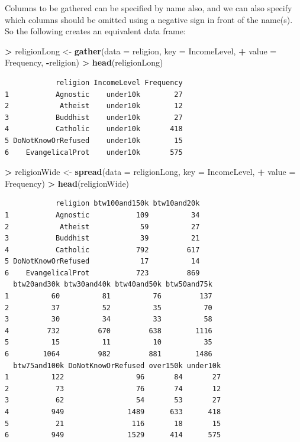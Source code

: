 \documentclass[]{krantz}
\makeatletter
\newenvironment{Shaded}{\begin{snugshade}}{\end{snugshade}}
\newcommand{\DataTypeTok}[1]{\textcolor[rgb]{0.27,0.27,0.27}{#1}}
\newcommand{\KeywordTok}[1]{\textcolor[rgb]{0.27,0.27,0.27}{\textbf{#1}}}
\newcommand{\NormalTok}[1]{#1}
\newcommand{\OperatorTok}[1]{\textcolor[rgb]{0.43,0.43,0.43}{\textbf{#1}}}
\newcommand{\StringTok}[1]{\textcolor[rgb]{0.5,0.5,0.5}{#1}}
\newenvironment{kframe}{%
\medskip{}
\setlength{\fboxsep}{.8em}
 \def\at@end@of@kframe{}%
 \ifinner\ifhmode%
  \def\at@end@of@kframe{\end{minipage}}%
  \begin{minipage}{\columnwidth}%
 \fi\fi%
 \def\FrameCommand##1{\hskip\@totalleftmargin \hskip-\fboxsep
 \colorbox{shadecolor}{##1}\hskip-\fboxsep
     \hskip-\linewidth \hskip-\@totalleftmargin \hskip\columnwidth}%
 \MakeFramed {\advance\hsize-\width
   \@totalleftmargin\z@ \linewidth\hsize
   \@setminipage}}%
 {\par\unskip\endMakeFramed%
 \at@end@of@kframe}
\renewenvironment{Shaded}{\begin{kframe}}{\end{kframe}}
\makeatother
\begin{document}
Columns to be gathered can be specified by name also, and we can also specify which columns should be omitted using a negative sign in front of the name(s). So the following creates an equivalent data frame:

\begin{Shaded}
\begin{Highlighting}[]
\OperatorTok{>}\StringTok{ }\NormalTok{religionLong <-}\StringTok{ }\KeywordTok{gather}\NormalTok{(}\DataTypeTok{data =}\NormalTok{ religion, }\DataTypeTok{key =}\NormalTok{ IncomeLevel, }
\OperatorTok{+}\StringTok{                        }\DataTypeTok{value =}\NormalTok{ Frequency, }\OperatorTok{-}\NormalTok{religion)}
\OperatorTok{>}\StringTok{ }\KeywordTok{head}\NormalTok{(religionLong)}
\end{Highlighting}
\end{Shaded}

\begin{verbatim}
            religion IncomeLevel Frequency
1           Agnostic    under10k        27
2            Atheist    under10k        12
3           Buddhist    under10k        27
4           Catholic    under10k       418
5 DoNotKnowOrRefused    under10k        15
6    EvangelicalProt    under10k       575
\end{verbatim}

\begin{Shaded}
\begin{Highlighting}[]
\OperatorTok{>}\StringTok{ }\NormalTok{religionWide <-}\StringTok{ }\KeywordTok{spread}\NormalTok{(}\DataTypeTok{data =}\NormalTok{ religionLong, }\DataTypeTok{key =}\NormalTok{ IncomeLevel, }
\OperatorTok{+}\StringTok{   }\DataTypeTok{value =}\NormalTok{ Frequency)}
\OperatorTok{>}\StringTok{ }\KeywordTok{head}\NormalTok{(religionWide)}
\end{Highlighting}
\end{Shaded}

\begin{verbatim}
            religion btw100and150k btw10and20k
1           Agnostic           109          34
2            Atheist            59          27
3           Buddhist            39          21
4           Catholic           792         617
5 DoNotKnowOrRefused            17          14
6    EvangelicalProt           723         869
  btw20and30k btw30and40k btw40and50k btw50and75k
1          60          81          76         137
2          37          52          35          70
3          30          34          33          58
4         732         670         638        1116
5          15          11          10          35
6        1064         982         881        1486
  btw75and100k DoNotKnowOrRefused over150k under10k
1          122                 96       84       27
2           73                 76       74       12
3           62                 54       53       27
4          949               1489      633      418
5           21                116       18       15
6          949               1529      414      575
\end{verbatim}
\end{document}
